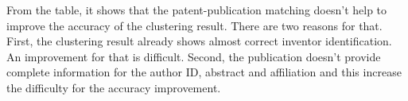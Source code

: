 From the table, it shows that the patent-publication matching doesn't help to improve the accuracy of the clustering result. There are two reasons for that. First, the clustering result already shows almost correct inventor identification. An improvement for that is difficult. Second, the publication doesn't provide complete information for the author ID, abstract and affiliation and this increase the difficulty for the accuracy improvement. 